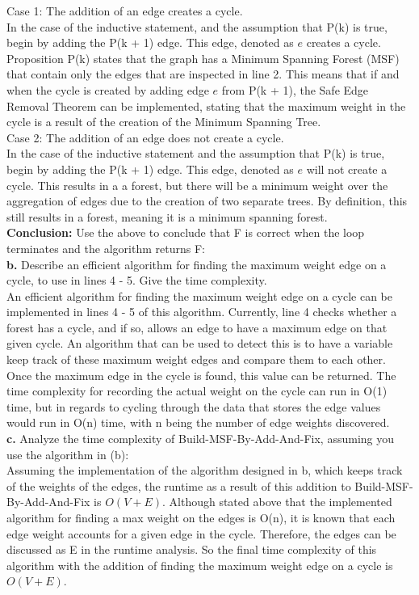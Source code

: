 \documentclass[12pt]{article}
\begin{document}
 \linebreak
 Case 1: The addition of an edge creates a cycle.\\ 
 In the case of the inductive statement, and the assumption that P(k) is true, begin by adding the P(k + 1) edge. This edge, denoted as $e$ creates a cycle. Proposition P(k) states that the graph has a Minimum Spanning Forest (MSF) that contain only the edges that are inspected in line 2. This means that if and when the cycle is created by adding edge $e$ from P(k + 1), the Safe Edge Removal Theorem can be implemented, stating that the maximum weight in the cycle is a result of the creation of the Minimum Spanning Tree. \\
 \linebreak
 Case 2: The addition of an edge does not create a cycle. \\
 In the case of the inductive statement and the assumption that P(k) is true, begin by adding the P(k + 1) edge. This edge, denoted as $e$ will not create a cycle. This results in a a forest, but there will be a minimum weight over the aggregation of edges due to the creation of two separate trees. By definition, this still results in a forest, meaning it is a minimum spanning forest. \\
 \linebreak
 \textbf{Conclusion:} Use the above to conclude that F is correct when the loop terminates and the algorithm returns F: \\
 \linebreak
 \textbf{b.} Describe an efficient algorithm for finding the maximum weight edge on a cycle, to use in lines 4 - 5. Give the time complexity. \\
 \linebreak
 An efficient algorithm for finding the maximum weight edge on a cycle can be implemented in lines 4 - 5 of this algorithm. Currently,  line 4 checks whether a forest has a cycle, and if so, allows an edge to have a maximum edge on that given cycle. An algorithm that can be used to detect this is to have a variable keep track of these maximum weight edges and compare them to each other. Once the maximum edge in the cycle is found, this value can be returned. The time complexity for recording the actual weight on the cycle can run in O(1) time, but in regards to cycling through the data that stores the edge values would run in O(n) time, with n being the number of edge weights discovered. \\
 \linebreak
 \textbf{c.} Analyze the time complexity of Build-MSF-By-Add-And-Fix, assuming you use the algorithm in (b): \\
 \linebreak
 Assuming the implementation of the algorithm designed in b, which keeps track of the weights of the edges, the runtime as a result of this addition to Build-MSF-By-Add-And-Fix is $O(V+E)$. Although stated above that the implemented algorithm for finding a max weight on the edges is O(n), it is known that each edge weight accounts for a given edge in the cycle. Therefore, the edges can be discussed as E in the runtime analysis. So the final time complexity of this algorithm with the addition of finding the maximum weight edge on a cycle is $O(V + E)$. 
\end{document}
